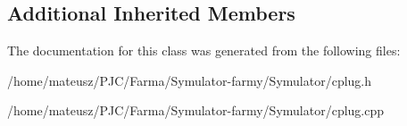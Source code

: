 \subsection*{Additional Inherited Members}


The documentation for this class was generated from the following files\+:\begin{DoxyCompactItemize}
\item 
/home/mateusz/\+P\+J\+C/\+Farma/\+Symulator-\/farmy/\+Symulator/cplug.\+h\item 
/home/mateusz/\+P\+J\+C/\+Farma/\+Symulator-\/farmy/\+Symulator/cplug.\+cpp\end{DoxyCompactItemize}
